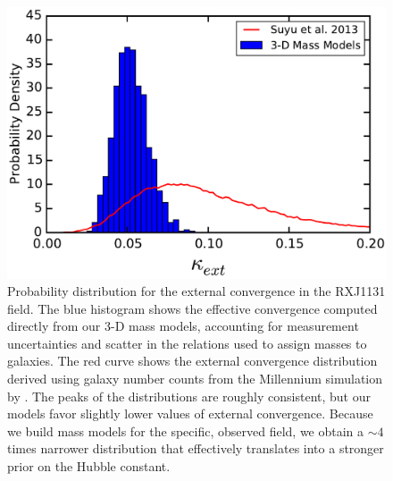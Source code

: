 \documentclass{emulateapj}
\begin{document}
\begin{figure}[t]
\begin{center}
\includegraphics[width=\columnwidth]{suyu_kappa.pdf}
\caption{\label{fig:kappa} Probability distribution for the external convergence in the RXJ1131 field. The blue histogram shows the effective convergence computed directly from our 3-D mass models, accounting for measurement uncertainties and scatter in the relations used to assign masses to galaxies. The red curve shows the external convergence distribution derived using galaxy number counts from the Millennium simulation by \citet{Suyu13}. The peaks of the distributions are roughly consistent, but our models favor slightly lower values of external convergence. Because we build mass models for the specific, observed field, we obtain a $\sim 4$ times narrower distribution that effectively translates into a stronger prior on the Hubble constant.%
}
\end{center}
\end{figure}
\end{document}
